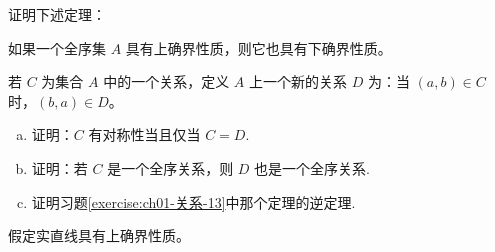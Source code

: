 \documentclass[../../main.tex]{subfiles}
\begin{document}
\begin{exercise}\label{exercise:ch01-关系-13}
证明下述定理：
\begin{theorem}\label{theorem:ch01-上下确界等价}
如果一个全序集 $A$ 具有上确界性质，则它也具有下确界性质。
\end{theorem}
\end{exercise}

\begin{exercise}\label{exercise:ch01-关系-14}
若 $C$ 为集合 $A$ 中的一个关系，定义 $A$ 上一个新的关系 $D$ 为：当 $(a, b) \in C$ 时，$(b, a) \in D$。
\begin{enumerate}[(a)]
\item 证明：$C$ 有对称性当且仅当 $C = D$.
\item 证明：若 $C$ 是一个全序关系，则 $D$ 也是一个全序关系.
\item 证明习题\cref{exercise:ch01-关系-13}中那个定理的逆定理.
\end{enumerate}
\end{exercise}

\begin{exercise}\label{exercise:ch01-关系-15}
假定实直线具有上确界性质。
\begin{enumerate}[(a)]
\item 证明集合
\begin{align*}
[0, 1] = \{x \mid 0 \leqslant x \leqslant 1\},
\end{align*}
\begin{align*}
[0, 1) = \{x \mid 0 \leqslant x < 1\}
\end{align*}
具有上确界性质.
\item 在字典序下的 $[0, 1] \times [0, 1]$ 具有上确界性质吗？对于 $[0, 1] \times [0, 1)$ 呢？对于 $[0, 1) \times [0, 1]$ 呢？
\end{enumerate}
\end{exercise}
\end{document}
